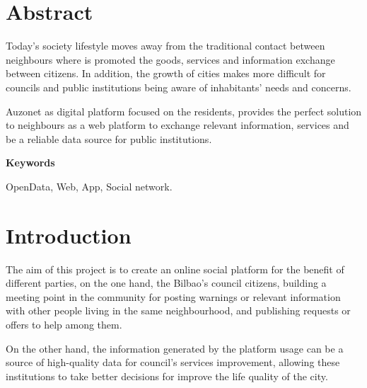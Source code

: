 \documentclass{DeustoFDP}
\begin{document}
\frontmatter
\pagestyle{plain}


\setcounter{page}{3}

\chapter*{Abstract}
Today's society lifestyle moves away from the traditional contact between neighbours
where is promoted the goods, services and information exchange between citizens. In addition, the growth of cities makes more difficult for councils and public institutions being aware of inhabitants' needs and concerns.

Auzonet as digital platform focused on the residents, provides the perfect solution to neighbours as a web platform to exchange relevant information, services and be a reliable data source for public institutions.

\vspace{2em}

{\Large\bfseries\sectionfont Keywords}
\vspace{3\medskipamount}

OpenData, Web, App, Social network.

\cleardoublepage\tableofcontents
\cleardoublepage\listoffigures
\cleardoublepage\listoftables
\cleardoublepage\listoflistings

\mainmatter
\pagestyle{phdthesis}

\chapter{Introduction}\label{cha:introduction}
The aim of this project is to create an online social platform for the benefit of different parties, on the one hand, the Bilbao's council citizens, building a meeting point in the community for posting warnings or relevant information with other people living in the same neighbourhood, and publishing requests or offers to help among them.

On the other hand, the information generated by the platform usage can be a source of high-quality data for council's services improvement, allowing these institutions to take better decisions for improve the life quality of the city.
\end{document}
